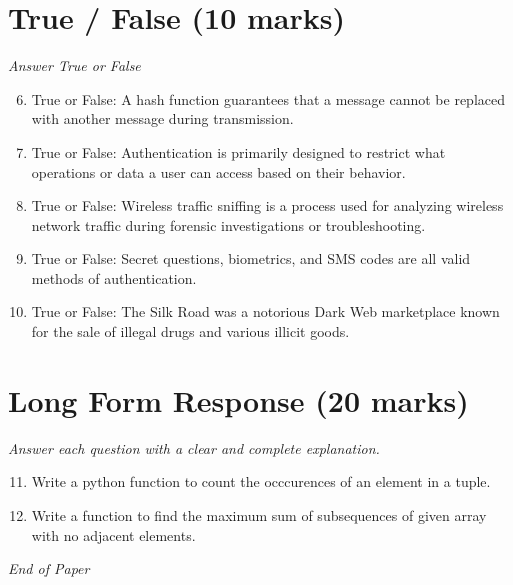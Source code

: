 \documentclass[12pt]{article}
\begin{document}
\section*{True / False (10 marks)}
\textit{Answer True or False}
\begin{enumerate}[label=\arabic*.]
\setcounter{enumi}{5}
\item True or False: A hash function guarantees that a message cannot be replaced with another message during transmission.
\item True or False: Authentication is primarily designed to restrict what operations or data a user can access based on their behavior.
\item True or False: Wireless traffic sniffing is a process used for analyzing wireless network traffic during forensic investigations or troubleshooting.
\item True or False: Secret questions, biometrics, and SMS codes are all valid methods of authentication.
\item True or False: The Silk Road was a notorious Dark Web marketplace known for the sale of illegal drugs and various illicit goods.
\end{enumerate}

\section*{Long Form Response (20 marks)}
\textit{Answer each question with a clear and complete explanation.}
\begin{enumerate}[label=\arabic*.]
\setcounter{enumi}{10}
\item Write a python function to count the occcurences of an element in a tuple.
\item Write a function to find the maximum sum of subsequences of given array with no adjacent elements.
\end{enumerate}

\vfill
\noindent\textit{End of Paper}
\end{document}
